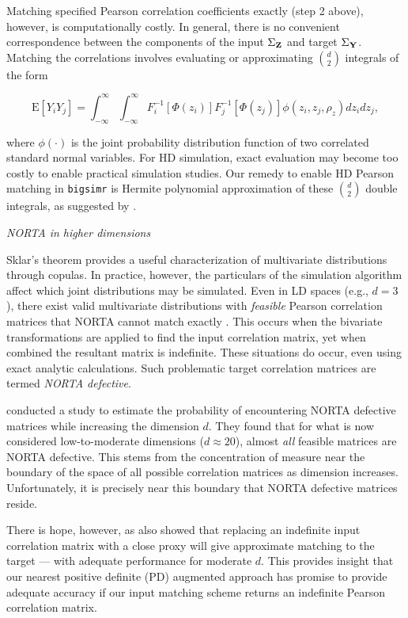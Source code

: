 \documentclass[
]{jss}
\begin{document}
Matching specified Pearson correlation coefficients exactly (step 2 above), however, is computationally costly. In general, there is no convenient correspondence between the components of the input \(\Sigma_{\bf Z}\) and target \(\Sigma_{\bf Y}\). Matching the correlations involves evaluating or approximating \(\binom{d}{2}\) integrals of the form

\begin{equation}
    \mathrm{E}\left[Y_i Y_j\right] = \int_{-\infty}^{\infty} \int_{-\infty}^{\infty} F_i^{-1}\left[\Phi(z_i)\right] F_j^{-1}\left[\Phi(z_j)\right] \phi(z_i, z_j, \rho_z) dz_i dz_j,
    \label{eq:pearsonIntegralRelation}
\end{equation}

where \(\phi(\cdot)\) is the joint probability distribution function of two correlated standard normal variables. For HD simulation, exact evaluation may become too costly to enable practical simulation studies. Our remedy to enable HD Pearson matching in \texttt{bigsimr} is Hermite polynomial approximation of these \(\binom{d}{2}\) double integrals, as suggested by \citet{XZ19}.

\emph{NORTA in higher dimensions}

Sklar's theorem provides a useful characterization of multivariate distributions through copulas. In practice, however, the particulars of the simulation algorithm affect which joint distributions may be simulated. Even in LD spaces (e.g., \(d=3\)), there exist valid multivariate distributions with \emph{feasible} Pearson correlation matrices that NORTA cannot match exactly \citep{LH75}. This occurs when the bivariate transformations are applied to find the input correlation matrix, yet when combined the resultant matrix is indefinite. These situations do occur, even using exact analytic calculations. Such problematic target correlation matrices are termed \emph{NORTA defective}.

\citet{GH02} conducted a study to estimate the probability of encountering NORTA defective matrices while increasing the dimension \(d\). They found that for what is now considered low-to-moderate dimensions (\(d \approx 20\)), almost \emph{all} feasible matrices are NORTA defective. This stems from the concentration of measure near the boundary of the space of all possible correlation matrices as dimension increases. Unfortunately, it is precisely near this boundary that NORTA defective matrices reside.

There is hope, however, as \citet{GH02} also showed that replacing an indefinite input correlation matrix with a close proxy will give approximate matching to the target --- with adequate performance for moderate \(d\). This provides insight that our nearest positive definite (PD) augmented approach has promise to provide adequate accuracy if our input matching scheme returns an indefinite Pearson correlation matrix.
\end{document}
